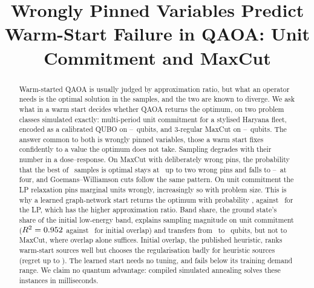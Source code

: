 \documentclass[10pt,conference]{IEEEtran}
\begin{document}
\title{Wrongly Pinned Variables Predict Warm-Start Failure in QAOA: Unit Commitment and MaxCut}

\author{
}

\maketitle

\begin{abstract}
Warm-started QAOA is usually judged by approximation ratio, but what an operator needs is the optimal solution in the samples, and the two are known to diverge. We ask what in a warm start decides whether QAOA returns the optimum, on two problem classes simulated exactly: multi-period unit commitment for a stylised Haryana fleet, encoded as a calibrated QUBO on \NLtwo--\NLfour\ qubits, and 3-regular MaxCut on \MCSizeTwelve--\MCSizeTwenty\ qubits. The answer common to both is wrongly pinned variables, those a warm start fixes confidently to a value the optimum does not take. Sampling degrades with their number in a dose--response. On MaxCut with deliberately wrong pins, the probability that the best of \KMax\ samples is optimal stays at \MCDoseTwoMin\ up to two wrong pins and falls to \MCDoseFourMin--\MCDoseFourMax\ at four, and Goemans--Williamson cuts follow the same pattern. On unit commitment the LP relaxation pins marginal units wrongly, increasingly so with problem size. This is why a learned graph-network start returns the optimum with probability \PgndCmilp, against \PgndD\ for the LP, which has the higher approximation ratio. Band share, the ground state's share of the initial low-energy band, explains sampling magnitude on unit commitment ($R^2=0.952$ against \BSRtwoOverlap\ for initial overlap) and transfers from \NLtwo\ to \NLfour\ qubits, but not to MaxCut, where overlap alone suffices. Initial overlap, the published heuristic, ranks warm-start sources well but chooses the regularisation badly for heuristic sources (regret up to \EROvWorst). The learned start needs no tuning, and fails below its training demand range. We claim no quantum advantage: compiled simulated annealing solves these instances in milliseconds.
\end{abstract}









\end{document}

